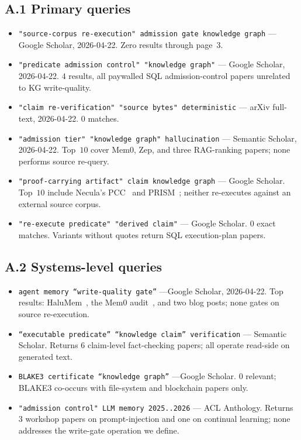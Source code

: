 \documentclass[10pt,a4paper]{article}
\begin{document}
\subsection*{A.1 Primary queries}
\begin{itemize}[leftmargin=*,itemsep=3pt,topsep=2pt]
  \item \texttt{"source-corpus re-execution" admission gate knowledge graph}
        --- Google Scholar, 2026-04-22. Zero results through page~3.
  \item \texttt{"predicate admission control" "knowledge graph"}
        --- Google Scholar, 2026-04-22. $4$ results, all paywalled
        SQL admission-control papers unrelated to KG write-quality.
  \item \texttt{"claim re-verification" "source bytes" deterministic}
        --- arXiv full-text, 2026-04-22. $0$ matches.
  \item \texttt{"admission tier" "knowledge graph" hallucination}
        --- Semantic Scholar, 2026-04-22. Top~$10$ cover Mem0,
        Zep, and three RAG-ranking papers; none performs source re-query.
  \item \texttt{"proof-carrying artifact" claim knowledge graph}
        --- Google Scholar. Top~$10$ include Necula's PCC~\cite{necula1996pcc}
        and PRISM~\cite{prism2025}; neither re-executes against an
        external source corpus.
  \item \texttt{"re-execute predicate" "derived claim"}
        --- Google Scholar. $0$ exact matches. Variants without quotes
        return SQL execution-plan papers.
\end{itemize}

\subsection*{A.2 Systems-level queries}
\begin{itemize}[leftmargin=*,itemsep=3pt,topsep=2pt]
  \item \texttt{agent memory ``write-quality gate''} ---Google Scholar,
        2026-04-22. Top results: HaluMem~\cite{halumem2025},
        the Mem0 audit~\cite{mem0junk}, and two blog posts; none gates
        on source re-execution.
  \item \texttt{``executable predicate'' ``knowledge claim'' verification}
        --- Semantic Scholar. Returns $6$ claim-level fact-checking
        papers; all operate read-side on generated text.
  \item \texttt{BLAKE3 certificate ``knowledge graph''} ---Google Scholar.
        $0$ relevant; BLAKE3 co-occurs with file-system and
        blockchain papers only.
  \item \texttt{"admission control" LLM memory 2025..2026} --- ACL
        Anthology. Returns $3$ workshop papers on prompt-injection and
        one on continual learning; none addresses the write-gate
        operation we define.
\end{itemize}
\end{document}
